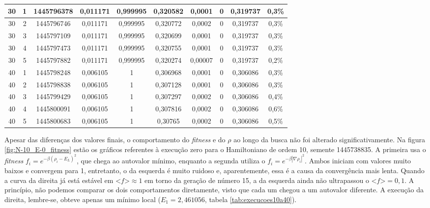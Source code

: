 \begin{landscape}
\begin{center}
\begin{table}[htbp]
\begin{tabular}{cccccccccc}
\hline
        30 &          1 & 1445796378 &   0,011171 &   0,999995 &   0,320582 &     0,0001 &          0 &   0,319737 &      0,3\% \\
\hline
        30 &          2 & 1445796746 &   0,011171 &   0,999995 &   0,320772 &     0,0002 &          0 &   0,319737 &      0,3\% \\
\hline
        30 &          3 & 1445797109 &   0,011171 &   0,999995 &   0,320699 &     0,0001 &          0 &   0,319737 &      0,3\% \\
\hline
        30 &          4 & 1445797473 &   0,011171 &   0,999995 &   0,320755 &     0,0001 &          0 &   0,319737 &      0,3\% \\
\hline
        30 &          5 & 1445797882 &   0,011171 &   0,999995 &   0,320274 &    0,00007 &          0 &   0,319737 &      0,2\% \\
\hline
        40 &          1 & 1445798248 &   0,006105 &          1 &   0,306968 &     0,0001 &          0 &   0,306086 &      0,3\% \\
\hline
        40 &          2 & 1445798838 &   0,006105 &          1 &   0,307128 &     0,0001 &          0 &   0,306086 &      0,3\% \\
\hline
        40 &          3 & 1445799429 &   0,006105 &          1 &   0,307297 &     0,0002 &          0 &   0,306086 &      0,4\% \\
\hline
        40 &          4 & 1445800091 &   0,006105 &          1 &   0,307816 &     0,0002 &          0 &   0,306086 &      0,6\% \\
\hline
        40 &          5 & 1445800683 &   0,006105 &          1 &    0,30765 &     0,0002 &          0 &   0,306086 &      0,5\% \\

\hline \hline
\end{tabular}
\end{table}  
\end{center}
\end{landscape}
	
	Apesar das diferenças dos valores finais, o comportamento do \textit{fitness} e do $\rho$ ao longo da busca não foi alterado significativamente. Na figura \ref{fig:N-10_E-0_fitness} estão os gráficos referentes à execução zero para o Hamiltoniano de ordem 10, semente 1445738835. A primeira usa o \textit{fitness} $f_i = e^{-\beta(\rho_i - E_L)^2}$, que chega ao autovalor mínimo, enquanto a segunda utiliza o $f_i = e^{-\beta | \nabla \rho_i |^2}$. Ambos iniciam com valores muito baixos e convergem para 1, entretanto, o da esquerda é muito ruidoso e, aparentemente, essa é a causa da convergência mais lenta. Quando a curva da direita já está estável em $\textit{<f>} \approx 1$ em torno da geração de número 15, a da esquerda ainda não ultrapassou o $\textit{<f>} = 0,1$. A princípio, não podemos comparar os dois comportamentos diretamente, visto que cada um chegou a um autovalor diferente. A execução da direita, lembre-se, obteve apenas um mínimo local ($E_1 = 2,461056$, tabela \ref{tab:execucoes10a40}).
	
